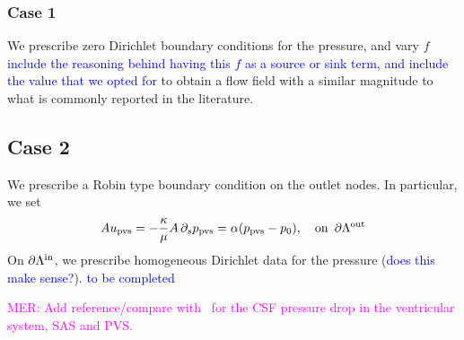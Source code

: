 \documentclass[fleqn,10pt]{wlscirep}
\newcommand{\rami}[1]{\textcolor{blue}{#1}}
\newcommand{\mer}[1]{\textcolor{magenta}{#1}}
\begin{document}
\subsubsection*{Case 1} We prescribe zero Dirichlet boundary conditions for the pressure, and vary $f$ \rami{include the reasoning behind having this $f$ as a source or sink term, and include the value that we opted for} to obtain a flow field with a similar magnitude to what is commonly reported in the literature.  

\subsection*{Case 2} We prescribe a Robin type boundary condition on the outlet nodes. In particular, we set 
\begin{equation}
A  u_{\rm pvs} =  - \frac{\kappa}{ \mu} A\, \partial_s p_{\rm pvs} = \alpha (p_{\rm pvs} - p_0), \quad  \rm on \,\,\, \partial \Lambda^{\rm out} 
\end{equation}
On $\partial \Lambda^{\rm in}$, we prescribe homogeneous Dirichlet data for the pressure (\rami{does this make sense?}). 
\rami{to be completed }

\mer{MER: Add reference/compare with~\cite{vinje2019respiratory} for the CSF pressure drop in the ventricular system, SAS and PVS.}
\end{document}
